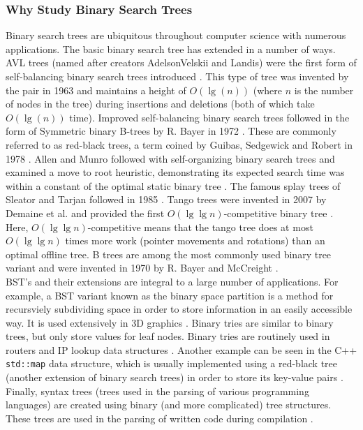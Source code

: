 \documentclass[]{beamer}
\theoremstyle{plain}
\begin{document}
\begin{frame} \frametitle{Why Study Binary Search Trees}

Binary search trees are ubiquitous throughout computer science with numerous applications. The basic binary search tree has extended in a number of ways. AVL trees (named after creators AdelsonVelskii and Landis) were the first form of self-balancing binary search trees introduced \cite{adelsonvelskii1963algorithm}. This type of tree was invented by the pair in 1963 and maintains a height of $O(\lg(n))$ (where $n$ is the number of nodes in the tree) during insertions and deletions (both of which take $O(\lg(n))$ time). Improved self-balancing binary search trees followed in the form of Symmetric binary B-trees by R. Bayer in 1972 \cite{bayer1972symmetric}. These are commonly referred to as red-black trees, a term coined by Guibas, Sedgewick and Robert in 1978 \cite{guibas1978dichromatic}. Allen and Munro followed with self-organizing binary search trees and examined a move to root heuristic, demonstrating its expected search time was within a constant of the optimal static binary tree \cite{allen1978self}. The famous splay trees of Sleator and Tarjan followed in 1985 \cite{sleator1985self}. Tango trees were invented in 2007 by Demaine et al. and provided the first $O(\lg \lg n)$-competitive binary tree \cite{demaine2007dynamic}. Here, $O(\lg \lg n)$-competitive means that the tango tree does at most $O(\lg \lg n)$ times more work (pointer movements and rotations) than an optimal offline tree. B trees are among the most commonly used binary tree variant and were invented in 1970 by R. Bayer and McCreight \cite{bayer1970organization}. \\

BST's and their extensions are integral to a large number of applications. For example, a BST variant known as the binary space partition is a method for recursviely subdividing space in order to store information in an easily accessible way. It is used extensively in 3D graphics \cite{schumacker1969study, paterson1992optimal}. Binary tries are similar to binary trees, but only store values for leaf nodes. Binary tries are routinely used in routers and IP lookup data structures \cite{song2010building}. Another example can be seen in the C++ \texttt{std::map} data structure, which is usually implemented using a red-black tree (another extension of binary search trees) in order to store its key-value pairs \cite{CppMap}. Finally, syntax trees (trees used in the parsing of various programming languages) are created using binary (and more complicated) tree structures. These trees are used in the parsing of written code during compilation \cite{louden1997compiler}.
\end{frame}
\end{document}
